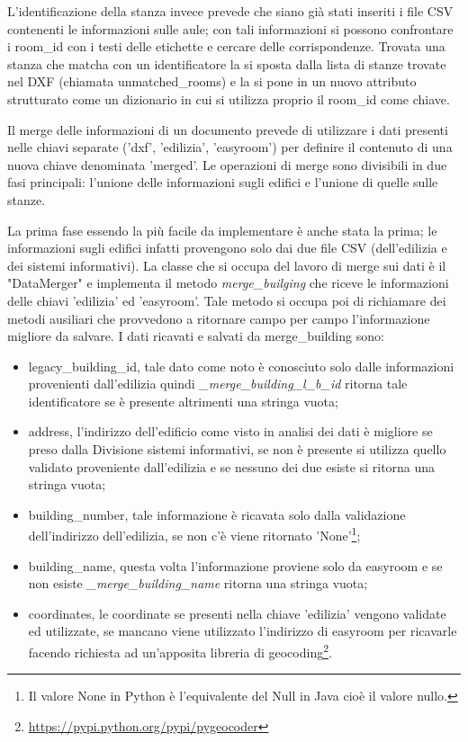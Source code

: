 \documentclass[12pt]{report}
\begin{document}
L'identificazione della stanza invece prevede che siano già stati inseriti i file CSV contenenti le informazioni sulle aule; con tali informazioni si possono confrontare i room\_id con i testi delle etichette e cercare delle corrispondenze.
Trovata una stanza che matcha con un identificatore la si sposta dalla lista di stanze trovate nel DXF (chiamata unmatched\_rooms) e la si pone in un nuovo attributo strutturato come un dizionario in cui si utilizza proprio il room\_id come chiave. 

\vspace{5mm} %

Il merge delle informazioni di un documento prevede di utilizzare i dati presenti nelle chiavi separate ('dxf', 'edilizia', 'easyroom') per definire il contenuto di una nuova chiave denominata 'merged'.
Le operazioni di merge sono divisibili in due fasi principali: l'unione delle informazioni sugli edifici e l'unione di quelle sulle stanze.

La prima fase essendo la più facile da implementare è anche stata la prima; le informazioni sugli edifici infatti provengono solo dai due file CSV (dell'edilizia e dei sistemi informativi).
La classe che si occupa del lavoro di merge sui dati è il "DataMerger" e implementa il metodo \textit{merge\_builging} che riceve le informazioni delle chiavi 'edilizia' ed 'easyroom'. Tale metodo si occupa poi di richiamare dei metodi ausiliari che provvedono a ritornare campo per campo l'informazione migliore da salvare. I dati ricavati e salvati da merge\_building sono:
\begin{itemize}
\item legacy\_building\_id, tale dato come noto è conosciuto solo dalle informazioni provenienti dall'edilizia quindi \textit{\_merge\_building\_l\_b\_id} ritorna tale identificatore se è presente altrimenti una stringa vuota;
\item address, l'indirizzo dell'edificio come visto in analisi dei dati è migliore se preso dalla Divisione sistemi informativi, se non è presente si utilizza quello validato proveniente dall'edilizia e se nessuno dei due esiste si ritorna una stringa vuota;
\item building\_number, tale informazione è ricavata solo dalla validazione dell'indirizzo dell'edilizia, se non c'è viene ritornato 'None'\footnote{Il valore None in Python è l'equivalente del Null in Java cioè il valore nullo.};
\item building\_name, questa volta l'informazione proviene solo da easyroom e se non esiste \textit{\_merge\_building\_name} ritorna una stringa vuota;
\item coordinates, le coordinate se presenti nella chiave 'edilizia' vengono validate ed utilizzate, se mancano viene utilizzato l'indirizzo di easyroom per ricavarle facendo richiesta ad un'apposita libreria di geocoding\footnote{\url{https://pypi.python.org/pypi/pygeocoder}}. 
\end{itemize}
\end{document}
